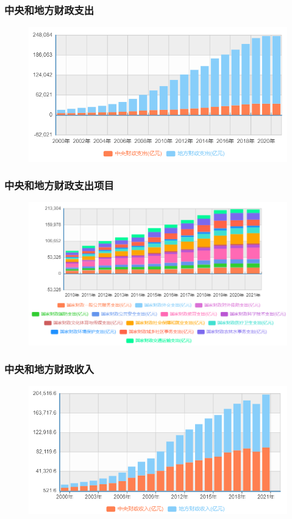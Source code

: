 \documentclass[aspectratio=169, 12pt]{beamer}
\begin{document}
\begin{frame}[plain]
    \frametitle{中央和地方财政支出}
    \begin{figure}
        \centering
        \includegraphics[width=1.0\textwidth]{./resources/figure/spend.png}
    \end{figure}
\end{frame}

\begin{frame}[plain]
    \frametitle{中央和地方财政支出项目}
    \begin{figure}
        \centering
        \includegraphics[width=1.0\textwidth]{./resources/figure/spendratio.png}
    \end{figure}
\end{frame}

\begin{frame}[plain]
    \frametitle{中央和地方财政收入}
    \begin{figure}
        \centering
        \includegraphics[width=1.0\textwidth]{./resources/figure/income.png}
    \end{figure}
\end{frame}
\end{document}

